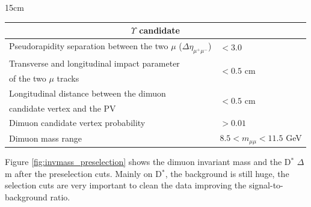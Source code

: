 \begin{table}[!htbp]{15cm}
\begin{tabular}{ l | l }
    \multicolumn{2}{c}{$\Upsilon$ candidate}                                                                     \\ \hline
    Pseudorapidity separation between the two $\mu$ ($\Delta\eta_{\mu^+\mu^-}$) & $< 3.0$                        \\ \hline
    Transverse and longitudinal impact parameter                                & \multirow[c]{2}{*}{$< 0.5$ cm} \\
    of the two $\mu$ tracks                                                     &                                \\ \hline
    Longitudinal distance between the dimuon                                    & \multirow[c]{2}{*}{$< 0.5$ cm} \\
    candidate vertex and the PV                                                 &                                \\ \hline
    Dimuon candidate vertex probability                                         & $> 0.01$                       \\ \hline
    Dimuon mass range                                                           & $8.5 < m_{\mu\mu} < 11.5$ GeV  \\ \hline
  \end{tabular}
  \label{tab:preselectioncuts}
\end{table}

Figure \ref{fig:invmass_preselection} shows the dimuon invariant mass and the D$^{*}$ $\Delta$m after the preselection cuts. Mainly on D$^*$, the background is still huge, the selection cuts are very important to clean the data improving the signal-to-background ratio.

